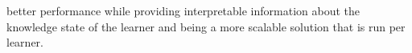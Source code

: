 \documentclass[letterpaper]{article} %
\begin{document}
better performance while providing interpretable information about the knowledge state of the learner and being a more scalable solution that is run per learner. 







    
\end{document}
